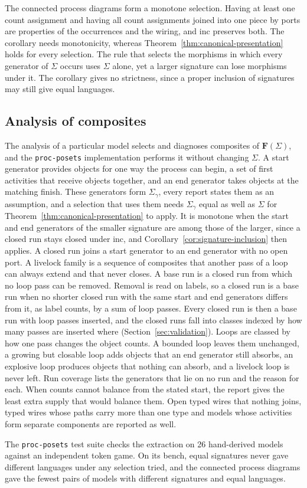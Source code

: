 The connected process diagrams form a monotone selection. Having at least one count assignment
and having all count assignments joined into one piece by ports are properties of the occurrences
and the wiring, and $\mathrm{inc}$ preserves both. The corollary needs monotonicity, whereas
Theorem~\ref{thm:canonical-presentation} holds for every selection. The rule that selects the
morphisms in which every generator of $\Sigma$ occurs uses $\Sigma$ alone, yet a larger signature
can lose morphisms under it. The corollary gives no strictness, since a proper inclusion of
signatures may still give equal languages.

\subsection{Analysis of composites}
\label{subsec:analysis}

The analysis of a particular model selects and diagnoses composites of $\mathbf{F}(\Sigma)$, and
the \texttt{proc-posets} implementation performs it without changing $\Sigma$. A start generator
provides objects for one way the process can begin, a set of first activities that receive
objects together, and an end generator takes objects at the matching finish. These generators
form $\Sigma_\gamma$, every report states them as an assumption, and a selection that uses them
needs $\Sigma_\gamma$ equal as well as $\Sigma$ for Theorem~\ref{thm:canonical-presentation} to
apply. It is monotone when the start and end generators of the smaller signature are among those
of the larger, since a closed run stays closed under $\mathrm{inc}$, and
Corollary~\ref{cor:signature-inclusion} then applies. A closed run joins a start generator to an end generator with no open port. A livelock
family is a sequence of composites that another pass of a loop can always extend and that never
closes. A base run is a closed run from which no loop pass can be removed. Removal is
read on labels, so a closed run is a base run when no shorter closed run with the same start and
end generators differs from it, as label counts, by a sum of loop passes. Every closed run is then a
base run with loop passes inserted, and the closed runs fall into classes indexed by how many
passes are inserted where (Section~\ref{sec:validation}). Loops are classed by how one pass changes the object counts. A bounded loop leaves them
unchanged, a growing but closable loop adds objects that an end generator still absorbs, an
explosive loop produces objects that nothing can absorb, and a livelock loop is never left. Run
coverage lists the generators that lie on no run and the reason for each. When counts cannot
balance from the stated start, the report gives the least extra supply that would balance them.
Open typed wires that nothing joins, typed wires whose paths carry more than one type and models whose
activities form separate components are reported as well.

The \texttt{proc-posets} test suite checks the extraction on 26 hand-derived models against an
independent token game. On its bench, equal signatures never gave different languages under any
selection tried, and the connected process diagrams gave the fewest pairs of models with different
signatures and equal languages.
